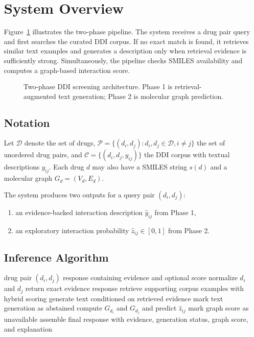 \documentclass[conference]{IEEEtran}
\begin{document}
\section{System Overview}
Figure~\ref{fig:architecture} illustrates the two-phase pipeline. The system receives a drug pair query and first searches the curated DDI corpus. If no exact match is found, it retrieves similar text examples and generates a description only when retrieval evidence is sufficiently strong. Simultaneously, the pipeline checks SMILES availability and computes a graph-based interaction score.

\begin{figure}[t]
    \centering
    \caption{Two-phase DDI screening architecture. Phase 1 is retrieval-augmented text generation; Phase 2 is molecular graph prediction.}
    \label{fig:architecture}
\end{figure}

\subsection{Notation}
Let $\mathcal{D}$ denote the set of drugs, $\mathcal{P} = \{(d_i, d_j) : d_i, d_j \in \mathcal{D}, i \neq j\}$ the set of unordered drug pairs, and $\mathcal{C} = \{(d_i, d_j, y_{ij})\}$ the DDI corpus with textual descriptions $y_{ij}$. Each drug $d$ may also have a SMILES string $s(d)$ and a molecular graph $G_d = (V_d, E_d)$.

The system produces two outputs for a query pair $(d_i, d_j)$:
\begin{enumerate}
    \item an evidence-backed interaction description $\hat{y}_{ij}$ from Phase 1,
    \item an exploratory interaction probability $\hat{z}_{ij} \in [0,1]$ from Phase 2.
\end{enumerate}

\subsection{Inference Algorithm}
\begin{algorithm}[t]
\caption{Two-Phase DDI Screening Inference}
\begin{algorithmic}[1]
\Require drug pair $(d_i, d_j)$
\Ensure response containing evidence and optional score
\State normalize $d_i$ and $d_j$
    \State return exact evidence response
\EndIf
\State retrieve supporting corpus examples with hybrid scoring
    \State generate text conditioned on retrieved evidence
\Else
    \State mark text generation as abstained
\EndIf
{}
    \State compute $G_{d_i}$ and $G_{d_j}$ and predict $\hat{z}_{ij}$
\Else
    \State mark graph score as unavailable
\EndIf
\State assemble final response with evidence, generation status, graph score, and explanation
\end{algorithmic}
\end{algorithm}
\end{document}

